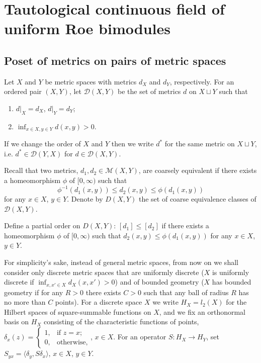 \documentclass[12pt]{amsart}
\theoremstyle{definition}
\begin{document}
\section{Tautological continuous field of uniform Roe bimodules}

\subsection{Poset of metrics on pairs of metric spaces}

Let $X$ and $Y$ be metric spaces with metrics $d_X$ and $d_Y$, respectively. For an ordered pair $(X,Y)$, let $\mathcal D(X,Y)$ be the set of metrics $d$ on $X\sqcup Y$ such that
\begin{enumerate}
\item
$d|_X=d_X$, $d|_Y=d_Y$;
\item
$\inf_{x\in X,y\in Y}d(x,y)>0$.
\end{enumerate}

If we change the order of $X$ and $Y$ then we write $d^*$ for the same metric on $X\sqcup Y$, i.e. $d^*\in\mathcal D(Y,X)$ for $d\in\mathcal D(X,Y)$.

Recall that two metrics, $d_1,d_2\in\mathcal M(X,Y)$, are coarsely equivalent if there exists a homeomorphism $\phi$ of $[0,\infty)$ such that
$$
\phi^{-1}(d_1(x,y))\leq d_2(x,y)\leq \phi(d_1(x,y))
$$
for any $x\in X$, $y\in Y$. Denote by $D(X,Y)$ the set of coarse equivalence classes of $\mathcal D(X,Y)$.

Define a partial order on $D(X,Y)$: $[d_1]\leq [d_2]$ if there exists a homeomorphism $\phi$ of $[0,\infty)$ such that $d_2(x,y)\leq \phi(d_1(x,y))$ for any $x\in X$, $y\in Y$. 

For simplicity's sake, instead of general metric spaces, from now on we shall consider only discrete metric spaces that are uniformly discrete ($X$ is uniformly discrete if $\inf_{x,x'\in X}d_X(x,x')>0$) and of bounded geometry ($X$ has bounded geometry if for any $R>0$ there exists $C>0$ such that any ball of radius $R$ has no more than $C$ points). For a discrete space $X$ we write $H_X=l_2(X)$ for the Hilbert spaces of square-summable functions on $X$, and we fix an orthonormal basis on $H_X$ consisting of the characteristic functions of points, $\delta_x(z)=\left\lbrace\begin{array}{cl}1,&\mbox{if\ }z=x;\\0,&\mbox{otherwise,}\end{array}\right.$, $x\in X$. For an operator $S:H_X\to H_Y$, set $S_{yx}=\langle \delta_y,S\delta_x\rangle$, $x\in X$, $y\in Y$. 
\end{document}
